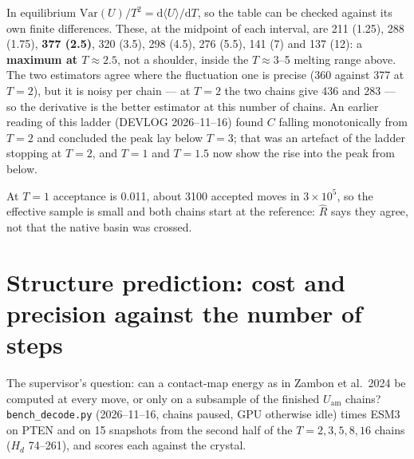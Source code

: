 \documentclass[11pt,a4paper]{article}
\newcommand{\Hd}{H_d}
\newcommand{\file}[1]{\texttt{#1}}
\newcommand{\Uam}{U_{\mathrm{am}}}
\begin{document}
\noindent
In equilibrium $\mathrm{Var}(U)/T^2 = \mathrm{d}\langle U\rangle/\mathrm{d}T$,
so the table can be checked against its own finite differences. These, at the
midpoint of each interval, are 211 (1.25), 288 (1.75), \textbf{377 (2.5)}, 320
(3.5), 298 (4.5), 276 (5.5), 141 (7) and 137 (12): a \textbf{maximum at
$T \approx 2.5$}, not a shoulder, inside the $T \approx 3$--5 melting range
above. The two estimators agree where the fluctuation one is precise (360
against 377 at $T=2$), but it is noisy per chain --- at $T=2$ the two chains
give 436 and 283 --- so the derivative is the better estimator at this number
of chains. An earlier reading of this ladder (DEVLOG 2026--11--16) found $C$
falling monotonically from $T=2$ and concluded the peak lay below $T=3$; that
was an artefact of the ladder stopping at $T=2$, and $T=1$ and $T=1.5$ now show
the rise into the peak from below.

At $T=1$ acceptance is 0.011, about 3100 accepted moves in $3\times10^5$, so
the effective sample is small and both chains start at the reference: $\hat{R}$
says they agree, not that the native basin was crossed.

\section{Structure prediction: cost and precision against the number of steps}
\label{sec:decode}

The supervisor's question: can a contact-map energy as in Zambon et al.\ 2024
be computed at every move, or only on a subsample of the finished $\Uam$
chains? \file{bench\_decode.py} (2026--11--16, chains paused, GPU otherwise
idle) times ESM3 on PTEN and on 15 snapshots from the second half of the
$T=2,3,5,8,16$ chains ($\Hd$ 74--261), and scores each against the crystal.
\end{document}
